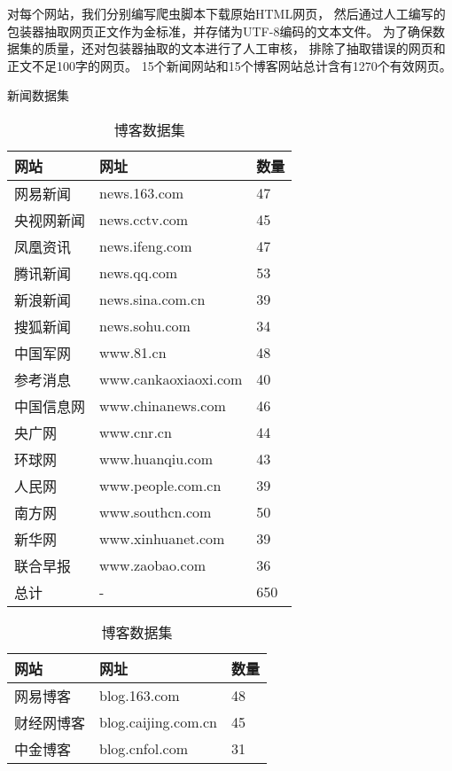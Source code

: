 对每个网站，我们分别编写爬虫脚本下载原始HTML网页，
然后通过人工编写的包装器抽取网页正文作为金标准，并存储为UTF-8编码的文本文件。
为了确保数据集的质量，还对包装器抽取的文本进行了人工审核，
排除了抽取错误的网页和正文不足100字的网页。
15个新闻网站和15个博客网站总计含有1270个有效网页。

\begin{table}[htbp]
\centering
\begin{minipage}{0.45\textwidth}
\caption{新闻数据集}
\label{tbl:news-dataset}
\vspace{0.5em}\centering\wuhao
\begin{tabular}{lll}
\toprule[1.5pt]
网站 & 网址 & 数量 \\
\midrule[1pt]
网易新闻 & news.163.com & 47 \\
央视网新闻 & news.cctv.com & 45 \\
凤凰资讯 & news.ifeng.com & 47 \\
腾讯新闻 & news.qq.com & 53 \\
新浪新闻 & news.sina.com.cn & 39 \\
搜狐新闻 & news.sohu.com & 34 \\
中国军网 & www.81.cn & 48 \\
参考消息 & www.cankaoxiaoxi.com & 40 \\
中国信息网 & www.chinanews.com & 46 \\
央广网 & www.cnr.cn & 44 \\
环球网 & www.huanqiu.com & 43 \\
人民网 & www.people.com.cn & 39 \\
南方网 & www.southcn.com & 50 \\
新华网 & www.xinhuanet.com & 39 \\
联合早报 & www.zaobao.com & 36 \\
总计 & - & 650 \\
\bottomrule[1.5pt]
\end{tabular}
\end{minipage}
\hfill
\begin{minipage}{0.45\textwidth}
\caption{博客数据集}
\label{tbl:blog-dataset}
\vspace{0.5em}\centering\wuhao
\begin{tabular}{lll}
\toprule[1.5pt]
网站 & 网址 & 数量 \\
\midrule[1pt]
网易博客 & blog.163.com & 48 \\
财经网博客 & blog.caijing.com.cn & 45 \\
中金博客 & blog.cnfol.com & 31 \\

\end{tabular}
\end{minipage}
\end{table}
